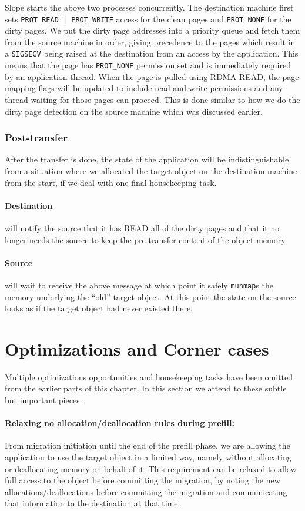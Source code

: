 Slope starts the above two processes concurrently. The destination machine
first sets
\texttt{PROT\_READ | PROT\_WRITE} access for the clean pages and
\texttt{PROT\_NONE} for the dirty pages. We put the dirty page addresses into 
a priority queue and fetch them from the source machine in order, giving
precedence to the pages which result in a
\texttt{SIGSEGV} being raised at the destination from an access by the
application. This means that the page has \texttt{PROT\_NONE} permission set and
is immediately required by an application thread. When the page is pulled using
RDMA READ, the page mapping flags will be updated to include read and write
permissions and any thread waiting for those pages can proceed. This is done
similar to how we do the dirty page detection on the source machine which was
discussed earlier.

\subsubsection{Post-transfer}
After the transfer is done, the state of the application will be
indistinguishable from a situation where we allocated the target object on
the destination machine from the start, if we deal with one final housekeeping
task.

\paragraph{Destination} will notify the source that it has READ all of the
dirty pages and that it no longer needs the source to keep the
pre-transfer content of the object memory.

\paragraph{Source} will wait to receive the above message at which point it
safely \texttt{munmap}s the memory underlying the ``old'' target object. At
this point the state on the source looks as if the target object had never existed
there.


\section{Optimizations and Corner cases}
\label{sec:optim}
Multiple optimizations opportunities and housekeeping tasks have been omitted
from the earlier parts of this chapter. In this section we attend to these
subtle but important pieces.

\paragraph{Relaxing no allocation/deallocation rules during prefill:}
From migration initiation until the end of the prefill phase, we are allowing
the application to use the target object in a limited way, namely without
allocating or deallocating memory on behalf of it. This requirement can be
relaxed to allow full access to the object before committing the
migration, by noting the new allocations/deallocations before committing the
migration and communicating that information to the destination at that time.

